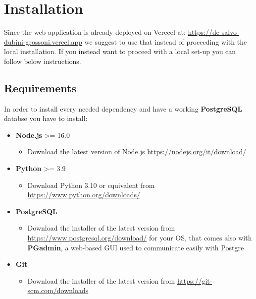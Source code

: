 \documentclass[table, 12pt]{article}
\begin{document}
\section{Installation}
Since the web application is already deployed on Verecel at:\newline
\url{https://de-salvo-dubini-grossoni.vercel.app} we suggest to use that instead of proceeding with the local installation.
If you instead want to proceed with a local set-up you can follow below instructions.

\subsection{Requirements}
In order to install every needed dependency and have a working \textbf{PostgreSQL} databse you have to install:
\begin{itemize}
    \item \textbf{Node.js} >= 16.0
    \begin{itemize}
        \item Download the latest version of Node.js \url{https://nodejs.org/it/download/}
    \end{itemize}

    \item \textbf{Python} >= 3.9
    \begin{itemize}
        \item Download Python 3.10 or equivalent from \url{https://www.python.org/downloads/}
    \end{itemize}

    \item \textbf{PostgreSQL}
    \begin{itemize}
        \item Download the installer of the latest version from \url{https://www.postgresql.org/download/} for your OS, that comes also with \textbf{PGadmin}, 
        a web-based GUI used to communicate easily with Postgre
    \end{itemize}

    \item \textbf{Git}
    \begin{itemize}
        \item Download the installer of the latest version from \url{https://git-scm.com/downloads}
    \end{itemize}

\end{itemize}
\end{document}
